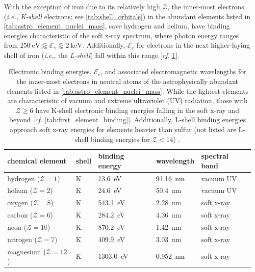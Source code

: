 With the exception of iron due to its relatively high $\mathcal{Z}$, the inner-most electrons (\emph{i.e., K-shell} electrons; see \cref{tab:shell_orbitals}) in the abundant elements listed in \cref{tab:astro_element_nuclei_mass}, save hydrogen and helium, have binding energies characteristic of the soft x-ray spectrum, where photon energy ranges from $\SI{250}{\electronvolt} \lessapprox \mathcal{E}_{\gamma} \lessapprox \SI{2}{\kilo\electronvolt}$. 
Additionally, $\mathcal{E}_e$ for electrons in the next higher-laying shell of iron (\emph{i.e.,} the \emph{L-shell}) fall within this range [\emph{cf.\@} \cref{tab:astro_element_binding}]. 
\begin{table}[]
 \centering
 \caption[Electronic binding energies for the inner-most electrons in neutral atoms of astrophysically abundant elements]{Electronic binding energies, $\mathcal{E}_e$, and associated electromagnetic wavelengths for the inner-most electrons in neutral atoms of the astrophysically abundant elements listed in \cref{tab:astro_element_nuclei_mass}. While the lightest elements are characteristic of vacuum and extreme ultraviolet (UV) radiation, those with $\mathcal{Z} \geq 6$ have K-shell electronic binding energies falling in the soft x-ray and beyond [\emph{cf.\@} \cref{tab:first_element_binding}]. Additionally, L-shell binding energies approach soft x-ray energies for elements heavier than sulfur (not listed are L-shell binding energies for $\mathcal{Z} < 14$) \cite{Attwood17}.}\label{tab:astro_element_binding}
 \begin{tabular}{@{}lllll@{}} 
 \toprule
 chemical element & shell & binding energy & wavelength & spectral band \\ \midrule
 hydrogen ($\mathcal{Z}=1$) & K & \SI{13.6}{\electronvolt} & \SI{91.16}{\nano\metre} & vacuum UV \\
 helium ($\mathcal{Z}=2$) & K & \SI{24.6}{\electronvolt} & \SI{50.4}{\nano\metre} & vacuum UV \\
 \midrule
 oxygen ($\mathcal{Z}=8$) & K & \SI{543.1}{\electronvolt} & \SI{2.28}{\nano\metre} & soft x-ray \\
 carbon ($\mathcal{Z}=6$) & K & \SI{284.2}{\electronvolt} & \SI{4.36}{\nano\metre} & soft x-ray \\
 neon ($\mathcal{Z}=10$) & K & \SI{870.2}{\electronvolt} & \SI{1.42}{\nano\metre} & soft x-ray \\
 nitrogen ($\mathcal{Z}=7$) & K & \SI{409.9}{\electronvolt} & \SI{3.03}{\nano\metre} & soft x-ray \\
 magnesium ($\mathcal{Z}=12$) & K & \SI{1303.0}{\electronvolt} & \SI{0.952}{\nano\metre} & soft x-ray \\ \midrule

\end{tabular}
\end{table}
